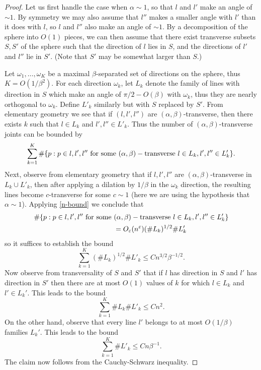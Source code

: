 \begin{proof}
Let us first handle the case when $\alpha \sim 1$, so that $l$ and
$l'$ make an angle of $\sim 1$.  By symmetry we may also assume
that $l''$ makes a smaller angle with $l'$ than it does with $l$,
so $l$ and $l''$ also make an angle of $\sim 1$.  By a
decomposition of the sphere into $O(1)$ pieces, we can then assume
that there exist transverse subsets $S, S'$ of the sphere such
that the direction of $l$ lies in $S$, and the directions of
$l'$ and $l''$ lie in $S'$.  (Note that $S'$ may be somewhat
larger than $S$.)

Let $\omega_1, \ldots, \omega_K$ be a maximal $\beta$-separated
set of directions on the sphere, thus $K = O(1/\beta^2)$.  For
each direction $\omega_k$, let $L_k$ denote the family of lines
with direction in $S$ which make an angle of $\pi/2 - O(\beta)$ with
$\omega_k$, thus they are nearly orthogonal to $\omega_k$.  Define
$L'_k$ similarly but with $S$ replaced by $S'$. From elementary
geometry we see that if $(l,l',l'')$ are
$(\alpha,\beta)$-transverse, then there exists $k$ such that $l
\in L_k$ and $l',l'' \in L'_k$.  Thus the number of
$(\alpha,\beta)$-transverse joints can be bounded by
$$ \sum_{k=1}^K \# \{ p: p \in l, l', l'' \hbox{ for some } (\alpha,\beta)-\hbox{transverse } l \in L_k, l',l'' \in L'_k \}.$$
Next, observe from elementary geometry that if $l, l', l''$ are
$(\alpha,\beta)$-transverse in $L_k \cup L'_k$, then after
applying a dilation by $1/\beta$ in the $\omega_k$ direction, the
resulting lines become $c$-transverse for some $c \sim 1$ (here we
are using the hypothesis that $\alpha \sim 1$).  Applying
\eqref{n-bound} we conclude that \begin{eqnarray*} \begin{aligned}
\# \{ p: p \in l, l', l'' \hbox{ for some }&
(\alpha,\beta)-\hbox{transverse } l \in L_k, l',l'' \in L'_k \}\\&
= O_\varepsilon( n^\varepsilon ) (\# L_k)^{1/2} \# L'_k \end{aligned}
\end{eqnarray*} so it suffices to establish the bound
$$ \sum_{k=1}^K (\# L_k)^{1/2} \# L'_k \leq C n^{3/2} \beta^{-1/2}.$$
Now observe from transversality of $S$ and $S'$ that if $l$ has
direction in $S$ and $l'$ has direction in $S'$ then there are
at most $O(1)$ values of $k$ for which $l \in L_k$ and $l' \in
L_{k}'$.  This leads to the bound
$$ \sum_{k=1}^K \# L_k \# L'_k \leq C n^2.$$
On the other hand, observe that every line $l'$ belongs to at most
$O(1/\beta)$ families $L_{k}'$.  This leads to the bound
$$ \sum_{k=1}^K \# L'_k \leq C n \beta^{-1}.$$
The claim now follows from the Cauchy-Schwarz inequality.


\end{proof}
